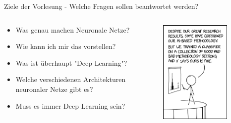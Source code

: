 \documentclass[aspectratio=1610, xcolor=dvipsnames, 9pt]{beamer}
\begin{document}
\begin{frame}{Ziele der Vorlesung - Welche Fragen sollen beantwortet werden?}
  \begin{columns}
    \begin{column}{0.69\textwidth}
      \begin{itemize}
        \item Was genau machen Neuronale Netze? \newline
        \item Wie kann ich mir das vorstellen? \newline
        \item Was ist überhaupt "Deep Learning"?  \newline
        \item Welche verschiedenen Architekturen neuronaler Netze gibt es? \newline
        \item Muss es immer Deep Learning sein? \newline
      \end{itemize}
    \end{column}
    \begin{column}{0.3\textwidth}
 \begin{figure}
 \centering
             \includegraphics[width=0.9\textwidth]{images/ai_methodology.png}

\end{figure}
\end{column}
\end{columns}
\end{frame}
\end{document}
